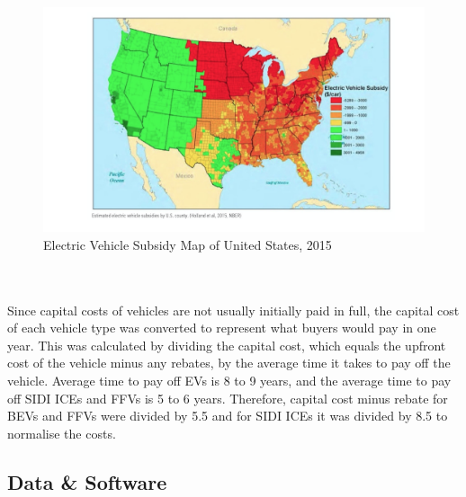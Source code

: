 \documentclass[answers]{exam}
\begin{document}
\begin{figure}[h]
    \centering
    \includegraphics[scale=0.5]{figure4.png}
    \caption{Electric Vehicle Subsidy Map of United States, 2015}
    \label{fig:my_label}
\end{figure}
\\~\\
Since capital costs of vehicles are not usually initially paid in full, the capital cost of each vehicle type was converted to represent what buyers would pay in one year. This was calculated by dividing the capital cost, which equals the upfront cost of the vehicle minus any rebates, by the average time it takes to pay off the vehicle. Average time to pay off EVs is 8 to 9 years\cite{kirby}, and the average time to pay off SIDI ICEs and FFVs is 5 to 6 years\cite{payoff}. Therefore, capital cost minus rebate for BEVs and FFVs were divided by 5.5 and for SIDI ICEs it was divided by 8.5 to normalise the costs.


\subsection{Data \& Software}
\end{document}

